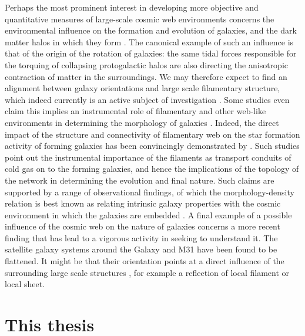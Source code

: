 Perhaps the most prominent interest in developing more objective and quantitative measures of large-scale cosmic web 
environments concerns the environmental influence on the formation and evolution of galaxies, and the dark matter 
halos in which they form \citep[see e.g.][]{Hahn2007b, Cautun2014a}. The canonical example of such 
an influence is that of the origin of the rotation of galaxies: the same tidal forces responsible for the torquing of collapsing 
protogalactic halos \citep{Hoyle1951,Peebles1969,Doroshkevich1970} are also directing the anisotropic contraction of matter in 
the surroundings. We may therefore expect to find an alignment between galaxy orientations and large scale filamentary 
structure, which indeed currently is an active subject of investigation \citep[e.g.][]{Aragon-Calvo2007,Leepen2000,Jones2010,Codis2012,
tempel2013,Trowland2013,Hirv2017}. Some studies even claim this implies an instrumental 
role of filamentary and other web-like environments in determining 
the morphology of galaxies \citep[see e.g.][for a short review]{Pichon2016}. Indeed, the direct impact of the structure and 
connectivity of filamentary web on the star formation activity of forming galaxies has been convincingly demonstrated 
by \citet[][see also \citealt{2015MNRAS.449.2087D,2015MNRAS.454..637G,Aragon-Calvo2016}]{Dekel2009b}. Such studies point out the instrumental importance of the filaments as transport conduits of cold 
gas on to the forming galaxies, and hence the implications of the topology of the network in determining the evolution and 
final nature. Such claims are supported by a range of observational findings, of which the morphology-density relation 
\citep{Dressler1980} is best known as relating intrinsic galaxy properties with the cosmic environment in which the 
galaxies are embedded \citep[see e.g.][]{Kuutma2017}. A final example of a possible influence of the cosmic web on the nature of 
galaxies concerns a more recent finding that has lead to a vigorous activity in seeking to understand it. The satellite galaxy 
systems around the Galaxy and M31 have been found to be flattened. It might be that their orientation points at a direct influence 
of the surrounding large scale structures \citep[see][]{Ibata2013,Cautun2015,Forero-Romero2014,Gonzalez2016}, for example a reflection of local filament or local sheet.


\section{This thesis}

